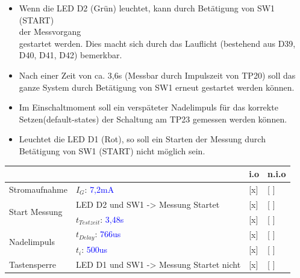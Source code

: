 
\begin{itemize}
	\item{Wenn die LED D2 (Grün) leuchtet, kann durch Betätigung von SW1 (START)\\ der Messvorgang\\ gestartet werden. Dies macht sich durch das Lauflicht (bestehend aus D39, D40, D41, D42) bemerkbar.}
	
	\item{Nach einer Zeit von ca. 3,6s (Messbar durch Impulszeit von TP20) soll das ganze System durch Betätigung von SW1 erneut gestartet werden können.}
	
	\item{Im Einschaltmoment soll ein verspäteter Nadelimpuls für das korrekte Setzen(default-states) der Schaltung am TP23 gemessen werden können.}
	
	 \item{Leuchtet die LED D1 (Rot), so soll ein Starten der Messung durch Betätigung von SW1 (START) nicht möglich sein.}
\end{itemize}


\renewcommand{\arraystretch}{2}
\begin{tabularx}{\textwidth}{p{}| p{} | p{} | p{}}

 &  & i.o & n.i.o \\

\hline

Stromaufnahme & $I_{G}$: \textcolor{blue}{7,2mA} 					& [x] & [ ] \\

\hline

\multirow{2}{*}{Start Messung}
		& LED D2 und SW1 -> Messung Startet		 					& [x] & [ ] \\
		& $t_{Testzeit}$:	\textcolor{blue}{3,48s}					& [x] & [ ] \\

\hline

\multirow{2}{*}{Nadelimpuls}
		& $t_{Delay}$: \textcolor{blue}{766us}						&[x] & [ ] 	\\
		& $t_{i}$: 	\textcolor{blue}{500us}							&[x] & [ ] 	\\
		
\hline

Tastensperre & LED D1 und SW1 -> Messung Startet nicht 				&[x] & [ ] \\
		
\end{tabularx}
\renewcommand{\arraystretch}{1}

